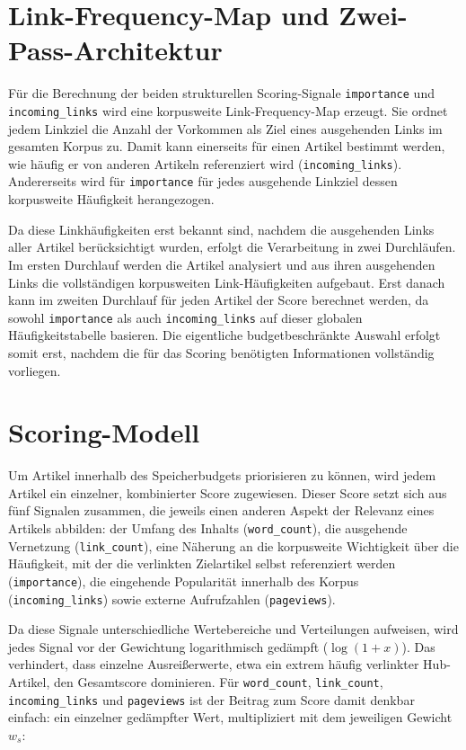 \section{Link-Frequency-Map und Zwei-Pass-Architektur}
\label{sec:link-frequenz-map}

Für die Berechnung der beiden strukturellen Scoring-Signale
\texttt{importance} und \texttt{incoming\_links} wird eine korpusweite
Link-Frequency-Map erzeugt. Sie ordnet jedem Linkziel die Anzahl der Vorkommen
als Ziel eines ausgehenden Links im gesamten Korpus zu. Damit kann einerseits
für einen Artikel bestimmt werden, wie häufig er von anderen Artikeln
referenziert wird (\texttt{incoming\_links}). Andererseits wird für
\texttt{importance} für jedes ausgehende Linkziel dessen korpusweite
Häufigkeit herangezogen.

Da diese Linkhäufigkeiten erst bekannt sind, nachdem die ausgehenden Links aller
Artikel berücksichtigt wurden, erfolgt die Verarbeitung in zwei Durchläufen.
Im ersten Durchlauf werden die Artikel analysiert und aus ihren ausgehenden
Links die vollständigen korpusweiten Link-Häufigkeiten aufgebaut. Erst danach
kann im zweiten Durchlauf für jeden Artikel der Score berechnet werden, da
sowohl \texttt{importance} als auch \texttt{incoming\_links} auf dieser
globalen Häufigkeitstabelle basieren. Die eigentliche budgetbeschränkte Auswahl
erfolgt somit erst, nachdem die für das Scoring benötigten Informationen vollständig vorliegen.


\section{Scoring-Modell}
Um Artikel innerhalb des Speicherbudgets priorisieren zu können, wird jedem Artikel ein einzelner,
kombinierter Score zugewiesen. Dieser Score setzt sich aus fünf Signalen zusammen, die jeweils einen anderen
Aspekt der Relevanz eines Artikels abbilden: der Umfang des Inhalts (\texttt{word\_count}), die ausgehende
Vernetzung (\texttt{link\_count}), eine Näherung an die korpusweite Wichtigkeit über die Häufigkeit,
mit der die verlinkten Zielartikel selbst referenziert werden (\texttt{importance}), die eingehende Popularität
innerhalb des Korpus (\texttt{incoming\_links}) sowie externe Aufrufzahlen (\texttt{pageviews}).

Da diese Signale unterschiedliche Wertebereiche und Verteilungen aufweisen, wird jedes Signal vor der
Gewichtung logarithmisch gedämpft ($\log(1+x)$). Das verhindert, dass einzelne Ausreißerwerte, etwa ein
extrem häufig verlinkter Hub-Artikel, den Gesamtscore dominieren. Für \texttt{word\_count}, \texttt{link\_count},
\texttt{incoming\_links} und \texttt{pageviews} ist der Beitrag zum Score damit denkbar einfach: ein einzelner
gedämpfter Wert, multipliziert mit dem jeweiligen Gewicht $w_s$:

